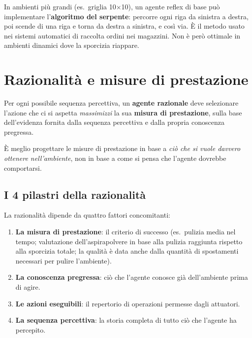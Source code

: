 \begin{notebox}
In ambienti più grandi (es.\ griglia 10$\times$10), un agente reflex di base può implementare l'\textbf{algoritmo del serpente}: percorre ogni riga da sinistra a destra, poi scende di una riga e torna da destra a sinistra, e così via. È il metodo usato nei sistemi automatici di raccolta ordini nei magazzini. Non è però ottimale in ambienti dinamici dove la sporcizia riappare.
\end{notebox}


\section{Razionalità e misure di prestazione}
\begin{defbox}
Per ogni possibile sequenza percettiva, un \textbf{agente razionale} deve selezionare l'azione che ci si aspetta \emph{massimizzi} la sua \textbf{misura di prestazione}, sulla base dell'evidenza fornita dalla sequenza percettiva e dalla propria conoscenza pregressa.
\end{defbox}

È meglio progettare le misure di prestazione in base a \emph{ciò che si vuole davvero ottenere nell'ambiente}, non in base a come si pensa che l'agente dovrebbe comportarsi.


\subsection{I 4 pilastri della razionalità}
La razionalità dipende da quattro fattori concomitanti:

\begin{enumerate}
    \item \textbf{La misura di prestazione}: il criterio di successo (es.\ pulizia media nel tempo; valutazione dell'aspirapolvere in base alla pulizia raggiunta rispetto alla sporcizia totale; la qualit\`a \`e data anche dalla quantit\`a di spostamenti necessari per pulire l'ambiente).
    \item \textbf{La conoscenza pregressa}: ciò che l'agente conosce già dell'ambiente prima di agire.
    \item \textbf{Le azioni eseguibili}: il repertorio di operazioni permesse dagli attuatori.
    \item \textbf{La sequenza percettiva}: la storia completa di tutto ciò che l'agente ha percepito.
\end{enumerate}


